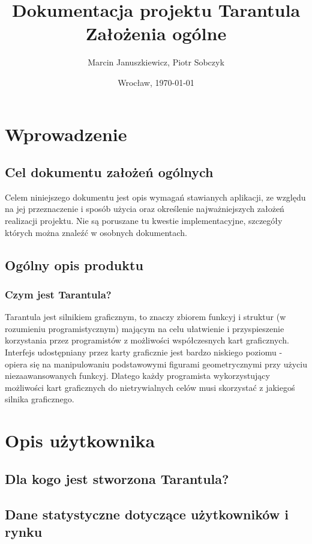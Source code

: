 \documentclass[11pt,leqno]{article}
\title{\LARGE Dokumentacja projektu \textbf{Tarantula}\\
							Założenia ogólne}
\author{Marcin Januszkiewicz, Piotr Sobczyk}
\date{Wrocław, \today}
\begin{document}
\maketitle 
\newpage
\pagestyle{headings}
\tableofcontents

\newpage


\newpage
\section{Wprowadzenie}

\subsection{Cel dokumentu założeń ogólnych}
Celem niniejszego dokumentu jest opis wymagań stawianych aplikacji, ze względu na jej przeznaczenie i 
sposób użycia oraz określenie najważniejszych założeń realizacji projektu. 
Nie są poruszane tu kwestie implementacyjne, szczegóły których można znaleźć w osobnych dokumentach.

\subsection{Ogólny opis produktu}
\subsubsection{Czym jest Tarantula?}
Tarantula jest silnikiem graficznym, to znaczy zbiorem funkcyj i struktur (w rozumieniu programistycznym) mającym 
na celu ułatwienie i przyspieszenie korzystania przez programistów z możliwości współczesnych kart graficznych. 
Interfejs udostępniany przez karty graficznie jest bardzo niskiego poziomu - 
opiera się na manipulowaniu podstawowymi figurami geometrycznymi przy użyciu niezaawansowanych funkcyj. 
Dlatego każdy programista wykorzystujący możliwości kart graficznych do nietrywialnych celów musi skorzystać z jakiegoś silnika graficznego.

\section{Opis użytkownika}
\subsection{Dla kogo jest stworzona Tarantula?}

\subsection{Dane statystyczne dotyczące użytkowników i rynku}
\end{document}

